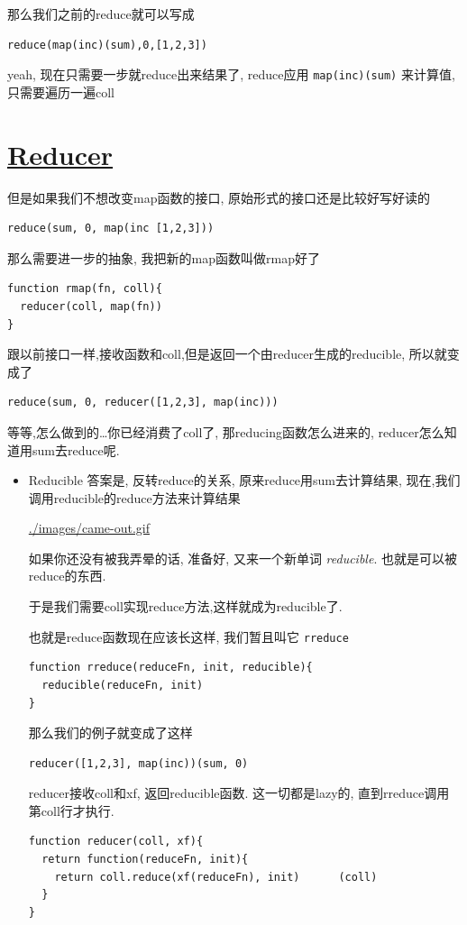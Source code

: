 \documentclass[a5paper]{book}
\begin{document}
那么我们之前的reduce就可以写成

\begin{verbatim}
reduce(map(inc)(sum),0,[1,2,3])
\end{verbatim}

yeah, 现在只需要一步就reduce出来结果了, reduce应用 \texttt{map(inc)(sum)} 来计算值, 只需要遍历一遍coll

\section{\href{http://clojure.org/reducers}{Reducer}}
\label{sec:orgheadline26}
但是如果我们不想改变map函数的接口, 原始形式的接口还是比较好写好读的
\begin{verbatim}
reduce(sum, 0, map(inc [1,2,3]))
\end{verbatim}
那么需要进一步的抽象, 我把新的map函数叫做rmap好了
\begin{verbatim}
function rmap(fn, coll){
  reducer(coll, map(fn))
}
\end{verbatim}
跟以前接口一样,接收函数和coll,但是返回一个由reducer生成的reducible, 所以就变成了
\begin{verbatim}
reduce(sum, 0, reducer([1,2,3], map(inc)))
\end{verbatim}

等等,怎么做到的\ldots{}你已经消费了coll了, 那reducing函数怎么进来的, reducer怎么知道用sum去reduce呢.


\begin{itemize}
\item Reducible
\label{sec:orgheadline25}
答案是, 反转reduce的关系, 原来reduce用sum去计算结果, 现在,我们调用reducible的reduce方法来计算结果

\url{./images/came-out.gif}

如果你还没有被我弄晕的话, 准备好, 又来一个新单词 \emph{reducible}. 也就是可以被reduce的东西.

于是我们需要coll实现reduce方法,这样就成为reducible了.

也就是reduce函数现在应该长这样, 我们暂且叫它 \texttt{rreduce}
\begin{verbatim}
function rreduce(reduceFn, init, reducible){
  reducible(reduceFn, init)
}
\end{verbatim}
那么我们的例子就变成了这样
\begin{verbatim}
reducer([1,2,3], map(inc))(sum, 0)
\end{verbatim}
reducer接收coll和xf, 返回reducible函数. 这一切都是lazy的, 直到rreduce调用第coll行才执行.
\begin{verbatim}
function reducer(coll, xf){
  return function(reduceFn, init){
    return coll.reduce(xf(reduceFn), init)      (coll)
  }
}
\end{verbatim}
\end{itemize}
\end{document}
